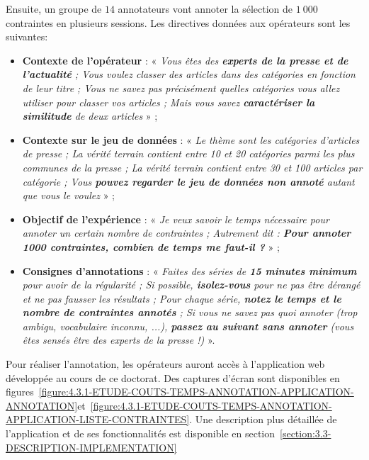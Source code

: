 			Ensuite, un groupe de $14$ annotateurs vont annoter la sélection de $1~000$ contraintes en plusieurs sessions.
			Les directives données aux opérateurs sont les suivantes:
			\begin{itemize}
				\item \textbf{Contexte de l'opérateur} :
				« \textit{Vous êtes des \textbf{experts de la presse et de l’actualité} ; Vous voulez classer des articles dans des catégories en fonction de leur titre ; Vous ne savez pas précisément quelles catégories vous allez utiliser pour classer vos articles ; Mais vous savez \textbf{caractériser la similitude} de deux articles} » ;
				\item \textbf{Contexte sur le jeu de données} :
				« \textit{Le thème sont les catégories d’articles de presse ; La vérité terrain contient entre 10 et 20 catégories parmi les plus communes de la presse ; La vérité terrain contient entre 30 et 100 articles par catégorie ; Vous \textbf{pouvez regarder le jeu de données non annoté} autant que vous le voulez} » ;
				\item \textbf{Objectif de l'expérience} :
				« \textit{Je veux savoir le temps nécessaire pour annoter un certain nombre de contraintes ; Autrement dit : \textbf{Pour annoter 1000 contraintes, combien de temps me faut-il ?}} » ;
				\item \textbf{Consignes d'annotations} :
				« \textit{Faites des séries de \textbf{15 minutes minimum} pour avoir de la régularité ; Si possible, \textbf{isolez-vous} pour ne pas être dérangé et ne pas fausser les résultats ; Pour chaque série, \textbf{notez le temps et le nombre de contraintes annotés} ; Si vous ne savez pas quoi annoter (trop ambigu, vocabulaire inconnu, ...), \textbf{passez au suivant sans annoter} (vous êtes sensés être des experts de la presse !)} ».
			\end{itemize}
			Pour réaliser l'annotation, les opérateurs auront accès à l'application web développée au cours de ce doctorat.
			Des captures d'écran sont disponibles en figures~\ref{figure:4.3.1-ETUDE-COUTS-TEMPS-ANNOTATION-APPLICATION-ANNOTATION}et~\ref{figure:4.3.1-ETUDE-COUTS-TEMPS-ANNOTATION-APPLICATION-LISTE-CONTRAINTES}.
			Une description plus détaillée de l'application et de ses fonctionnalités est disponible en section~\ref{section:3.3-DESCRIPTION-IMPLEMENTATION}
